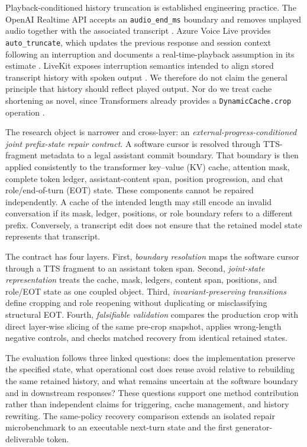 Playback-conditioned history truncation is established engineering practice. The OpenAI Realtime API accepts an \texttt{audio\_end\_ms} boundary and removes unplayed audio together with the associated transcript \citep{openaiRealtimeConversations}. Azure Voice Live provides \texttt{auto\_truncate}, which updates the previous response and session context following an interruption and documents a real-time-playback assumption in its estimate \citep{microsoftVoiceLiveAutoTruncation2026}. LiveKit exposes interruption semantics intended to align stored transcript history with spoken output \citep{livekitEventsErrorHandling}. We therefore do not claim the general principle that history should reflect played output. Nor do we treat cache shortening as novel, since Transformers already provides a \texttt{DynamicCache.crop} operation \citep{huggingFace2025TransformersCacheUtils,huggingFace2025KVCacheStrategies}.

The research object is narrower and cross-layer: an \emph{external-progress-conditioned joint prefix-state repair contract}. A software cursor is resolved through TTS-fragment metadata to a legal assistant commit boundary. That boundary is then applied consistently to the transformer key--value (KV) cache, attention mask, complete token ledger, assistant-content span, position progression, and chat role/end-of-turn (EOT) state. These components cannot be repaired independently. A cache of the intended length may still encode an invalid conversation if its mask, ledger, positions, or role boundary refers to a different prefix. Conversely, a transcript edit does not ensure that the retained model state represents that transcript.

The contract has four layers. First, \emph{boundary resolution} maps the software cursor through a TTS fragment to an assistant token span. Second, \emph{joint-state representation} treats the cache, mask, ledgers, content span, positions, and role/EOT state as one coupled object. Third, \emph{invariant-preserving transitions} define cropping and role reopening without duplicating or misclassifying structural EOT. Fourth, \emph{falsifiable validation} compares the production crop with direct layer-wise slicing of the same pre-crop snapshot, applies wrong-length negative controls, and checks matched recovery from identical retained states.

The evaluation follows three linked questions: does the implementation preserve the specified state, what operational cost does reuse avoid relative to rebuilding the same retained history, and what remains uncertain at the software boundary and in downstream responses? These questions support one method contribution rather than independent claims for triggering, cache management, and history rewriting. The same-policy recovery comparison extends an isolated repair microbenchmark to an executable next-turn state and the first generator-deliverable token.

